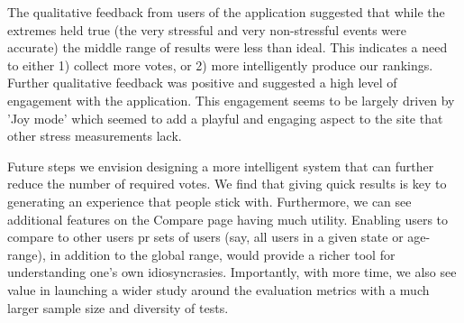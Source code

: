 \documentclass{sigchi}
\begin{document}
The qualitative feedback from users of the application suggested that while the extremes held true (the very stressful and very non-stressful events were accurate) the middle range of results were less than ideal. This indicates a need to either 1) collect more votes, or 2) more intelligently produce our rankings. Further qualitative feedback was positive and suggested a high level of engagement with the application. This engagement seems to be largely driven by 'Joy mode' which seemed to add a playful and engaging aspect to the site that other stress measurements lack. 


Future steps we envision designing a more intelligent system that can further reduce the number of required votes. We find that giving quick results is key to generating an experience that people stick with. Furthermore, we can see additional features on the Compare page having much utility. Enabling users to compare to other users pr sets of users (say, all users in a given state or age-range), in addition to the global range, would provide a richer tool for understanding one's own idiosyncrasies. Importantly, with more time, we also see value in launching a wider study around the evaluation metrics with a much larger sample size and diversity of tests.



\balance




\end{document}
